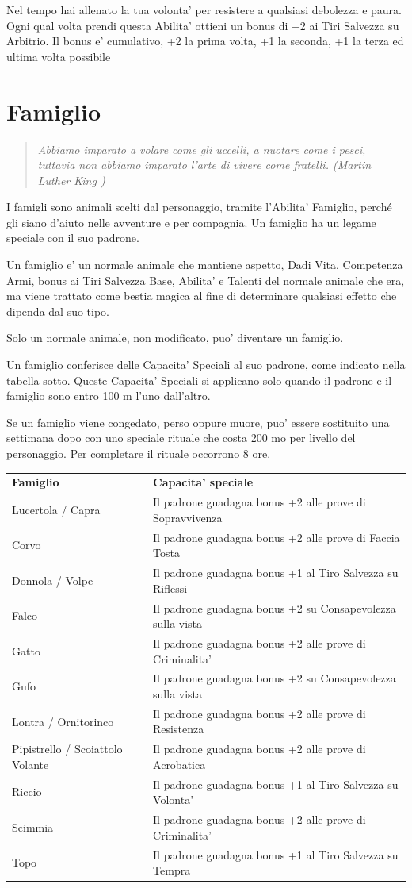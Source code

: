 \documentclass[a4paper,11pt,twoside,openany]{book}
\begin{document}
Nel tempo hai allenato la tua volonta' per resistere a qualsiasi debolezza e paura. Ogni qual volta prendi questa Abilita' ottieni un bonus di +2 ai Tiri Salvezza su Arbitrio. Il bonus e' cumulativo, +2 la prima volta, +1 la seconda, +1 la terza ed ultima volta possibile

\pagebreak

\section{Famiglio}

\label{famiglio}
\begin{quote}\textit{
Abbiamo imparato a volare come gli uccelli, a nuotare come i pesci, tuttavia non abbiamo imparato l'arte di vivere come fratelli. (Martin Luther King )
}\end{quote}

I famigli sono animali scelti dal personaggio, tramite l'Abilita' Famiglio, perché gli siano d'aiuto nelle avventure e per compagnia. Un famiglio ha un legame speciale con il suo padrone.

Un famiglio e' un normale animale che mantiene aspetto, Dadi Vita, Competenza Armi, bonus ai Tiri Salvezza Base, Abilita' e Talenti del normale animale che era, ma viene trattato come bestia magica al fine di determinare qualsiasi effetto che dipenda dal suo tipo. 

Solo un normale animale, non modificato, puo' diventare un famiglio.

Un famiglio conferisce delle Capacita' Speciali al suo padrone, come indicato nella tabella sotto. Queste Capacita' Speciali si applicano solo quando il padrone e il famiglio sono entro 100 m l'uno dall'altro.

Se un famiglio viene congedato, perso oppure muore, puo' essere sostituito una settimana dopo con uno speciale rituale che costa 200 mo per livello del personaggio. Per {\small completare} il rituale occorrono 8 ore.

\bigskip

\begin{tabular}{L{3cm} L{11.5cm}}
\toprule
\textbf{Famiglio} & \textbf{Capacita' speciale}\tabularnewline
Lucertola / Capra & Il padrone guadagna bonus +2 alle prove di Sopravvivenza\tabularnewline
Corvo & Il padrone guadagna bonus +2 alle prove di Faccia Tosta\tabularnewline
Donnola / Volpe & Il padrone guadagna bonus +1 al Tiro Salvezza su Riflessi\tabularnewline
Falco & Il padrone guadagna bonus +2 su Consapevolezza sulla vista\tabularnewline
Gatto & Il padrone guadagna bonus +2 alle prove di Criminalita'\tabularnewline
Gufo & Il padrone guadagna bonus +2 su Consapevolezza sulla vista\tabularnewline
Lontra / Ornitorinco & Il padrone guadagna bonus +2 alle prove di Resistenza\tabularnewline
Pipistrello / Scoiattolo Volante & Il padrone guadagna bonus +2 alle prove di Acrobatica\tabularnewline
Riccio & Il padrone guadagna bonus +1 al Tiro Salvezza su Volonta'\tabularnewline
Scimmia & Il padrone guadagna bonus +2 alle prove di Criminalita'\tabularnewline
Topo & Il padrone guadagna bonus +1 al Tiro Salvezza su Tempra\tabularnewline
\end{tabular}
\end{document}
